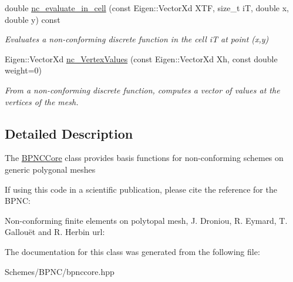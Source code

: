 \begin{DoxyCompactItemize}
double \hyperlink{group__BPNC_ga7a82bab8fa4bfe4f99796db632d9411d}{nc\+\_\+evaluate\+\_\+in\+\_\+cell} (const Eigen\+::\+Vector\+Xd X\+TF, size\+\_\+t iT, double x, double y) const
\begin{DoxyCompactList}\small\item\em Evaluates a non-\/conforming discrete function in the cell iT at point (x,y) \end{DoxyCompactList}\item 
Eigen\+::\+Vector\+Xd \hyperlink{group__BPNC_ga2c3a632143dcb66992710d39cfb9ed42}{nc\+\_\+\+Vertex\+Values} (const Eigen\+::\+Vector\+Xd Xh, const double weight=0)
\begin{DoxyCompactList}\small\item\em From a non-\/conforming discrete function, computes a vector of values at the vertices of the mesh. \end{DoxyCompactList}\end{DoxyCompactItemize}


\subsection{Detailed Description}
The \hyperlink{classHArDCore2D_1_1BPNCCore}{B\+P\+N\+C\+Core} class provides basis functions for non-\/conforming schemes on generic polygonal meshes

If using this code in a scientific publication, please cite the reference for the B\+P\+NC\+:

Non-\/conforming finite elements on polytopal mesh, J. Droniou, R. Eymard, T. Gallouët and R. Herbin url\+: 

The documentation for this class was generated from the following file\+:\begin{DoxyCompactItemize}
\item 
Schemes/\+B\+P\+N\+C/bpnccore.\+hpp\end{DoxyCompactItemize}

